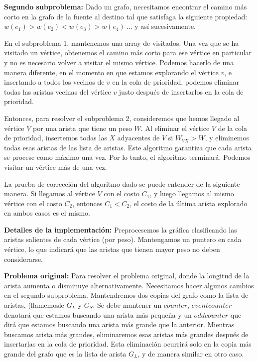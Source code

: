 \documentclass[12pt]{article}
\newcommand{\nl}{\vspace{0.3cm}}
\begin{document}
\nl

\textbf{Segundo subproblema:} Dado un grafo, necesitamos encontrar el camino más corto en la grafo de la fuente al destino tal que satisfaga la siguiente propiedad: $w(e_1) > w(e_2) < w(e_3) > w(e_4) \ ...$ y así sucesivamente.

\nl

En el subproblema 1, mantenemos una array de visitados. Una vez que se ha visitado un vértice, obtenemos el camino más corto para ese vértice en particular y no es necesario volver a visitar el mismo vértice. Podemos hacerlo de una manera diferente, en el momento en que estamos explorando el vértice $v$, e insertando a todos los vecinos de $v$ en la cola de prioridad, podemos eliminar todas las aristas vecinas del vértice $v$ justo después de insertarlos en la cola de prioridad.

\nl

Entonces, para resolver el subproblema 2, consideremos que hemos llegado al vértice $V$ por una arista que tiene un peso $W$. Al eliminar el vértice $V$ de la cola de prioridad, insertemos todas las $X$ adyacentes de $V$ si $W_{VX} > W$, y eliminemos todas esas aristas de las lista de aristas. Este algoritmo garantiza que cada arista se procese como máximo una vez. Por lo tanto, el algoritmo terminará. Podemos visitar un vértice más de una vez.

\nl

La prueba de corrección del algoritmo dado se puede entender de la siguiente manera. Si llegamos al vértice $V$ con el costo $C_1$, y luego llegamos al mismo vértice con el costo $C_2$, entonces $C_1 < C_2$, el costo de la última arista explorado en ambos casos es el mismo.

\nl

\textbf{Detalles de la implementación:} Preprocesemos la gráfica clasificando las aristas salientes de cada vértice (por peso). Mantengamos un puntero en cada vértice, lo que indicará que las aristas que tienen mayor peso no deben considerarse.

\nl

\textbf{Problema original:} Para resolver el problema original, donde la longitud de la arista aumenta o disminuye alternativamente. Necesitamos hacer algunos cambios en el segundo subproblema. Mantendremos dos copias del grafo como la lista de aristas, (llamemosle $G_L$ y $G_S$. Se debe mantener un $counter$, $event counter$ denotará que estamos buscando una arista más pequeña y un $odd counter$ que dirá que estamos buscando una arista más grande que la anterior. Mientras buscamos arista más grandes, eliminaremos esas aristas más grandes después de insertarlas en la cola de prioridad. Esta eliminación ocurrirá solo en la copia más grande del grafo que es la lista de arista $G_L$, y de manera similar en otro caso.
\end{document}
